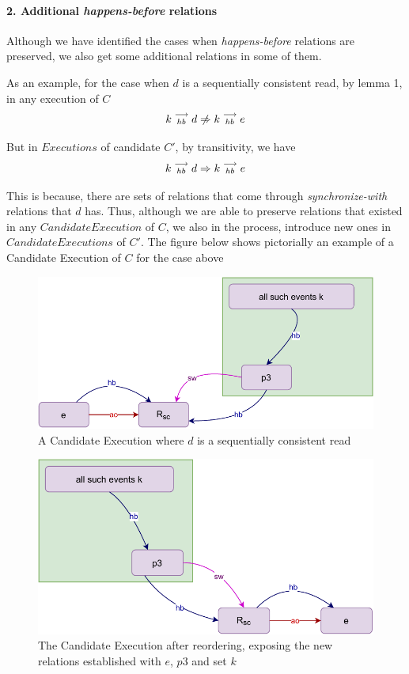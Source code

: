 
\paragraph{2. Additional \textit{happens-before} relations}
    Although we have identified the cases when \textit{happens-before} relations are preserved, we also get some additional relations in some of them.

    As an example, for the case when $d$ is a sequentially consistent read, by lemma 1, in any execution of $C$
    \[
        \reln{k}{hb}{d} \centernot\Rightarrow \reln{k}{hb}{e} 
    \]

    But in $Executions$ of candidate $C'$, by transitivity, we have 
    \[
        k\stackrel{\longrightarrow}{_{hb}}d \Rightarrow k\stackrel{\longrightarrow}{_{hb}}e 
    \]

    This is because, there are sets of relations that come through \textit{synchronize-with} relations that $d$ has. Thus, although we are able to preserve relations that existed in any $Candidate Execution$ of $C$, we also in the process, introduce new ones in $Candidate Executions$ of $C'$. The figure below shows pictorially an example of a Candidate Execution of $C$ for the case above 

    \begin{figure}[H]
        \centering
        \includegraphics[scale=0.7]{Q2(c).pdf}
        \caption{A Candidate Execution where $d$ is a sequentially consistent read}
        \label{fig:my_label}
    \end{figure}

    \begin{figure}[H]
        \centering
        \includegraphics[scale=0.7]{Q2(d).pdf}
        \caption{The Candidate Execution after reordering, exposing the new relations established with $e$, $p3$ and set $k$}
        \label{fig:my_label}
    \end{figure}

